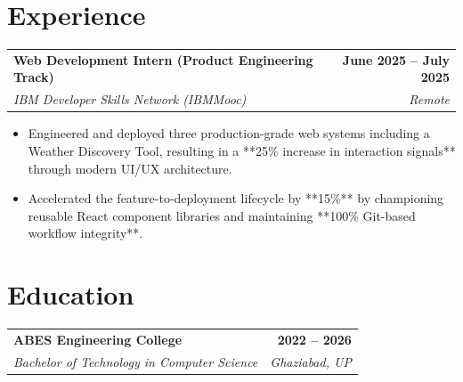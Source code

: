 \documentclass[letterpaper,11pt]{article}
\makeatletter
\newcommand{\resumeItem}[1]{\item\small{#1}}
\newcommand{\resumeEntryHeader}[4]{
  \vspace{2pt}
  \begin{tabular*}{1.0\textwidth}[t]{l@{\extracolsep{\fill}}r}
    \textbf{\large #1} & \textbf{\small #2} \\
    \textit{\small#3} & \textit{\small #4} \\
  \end{tabular*}\vspace{-12pt}
}
\makeatother
\begin{document}
\section{Experience}
\resumeEntryHeader
  {Web Development Intern (Product Engineering Track)}{June 2025 -- July 2025}
  {IBM Developer Skills Network (IBMMooc)}{Remote}
\begin{itemize}
\resumeItem{Engineered and deployed three production-grade web systems including a Weather Discovery Tool, resulting in a **25\% increase in interaction signals** through modern UI/UX architecture.}
\resumeItem{Accelerated the feature-to-deployment lifecycle by **15\%** by championing reusable React component libraries and maintaining **100\% Git-based workflow integrity**.}
\end{itemize}

\section{Education}
\resumeEntryHeader
  {ABES Engineering College}{2022 -- 2026}
  {Bachelor of Technology in Computer Science}{Ghaziabad, UP}
\end{document}
